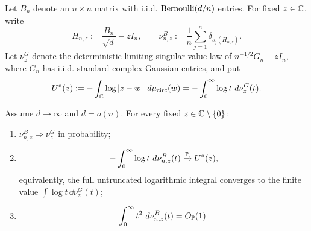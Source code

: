 Let $B_n$ denote an $n\times n$ matrix with i.i.d. $\operatorname{Bernoulli}(d/n)$ entries. For fixed $z\in\mathbb C$, write
\[
  H_{n,z}:=\frac{B_n}{\sqrt d}-zI_n,
  \qquad
  \nu^B_{n,z}:=\frac1n\sum_{j=1}^n\delta_{s_j(H_{n,z})}.
\]
Let $\nu_z^G$ denote the deterministic limiting singular-value law of
$n^{-1/2}G_n-zI_n$, where $G_n$ has i.i.d. standard complex Gaussian entries, and put
\begin{equation}\label{eq:Gaussian-log-potential}
  U^\circ(z):=-\int_\mathbb C\log\left|z-w\right|\,\,d\mu_{\mathrm{circ}}(w)
  =-\int_0^\infty\log t\,\,d\nu_z^G(t).
\end{equation}

\begin{proposition}\label{prop:Bernoulli-hermitization}
Assume $d\to\infty$ and $d=o(n)$. For every fixed $z\in\mathbb C\setminus\left\{0\right\}$:
\begin{enumerate}[label=\textup{(\roman*)}]
\item $\nu^B_{n,z}\Rightarrow\nu_z^G$ in probability;
\item
\begin{equation}\label{eq:Bernoulli-full-log}
  -\int_0^\infty\log t\,\,d\nu^B_{n,z}(t)
  \xrightarrow{\mathbb P}U^\circ(z),
\end{equation}
equivalently, the full untruncated logarithmic integral converges to the finite value
$\int\log t\,\dd\nu_z^G(t)$;
\item
\begin{equation}\label{eq:Bernoulli-second-moment}
  \int_0^\infty t^2\,\,d\nu^B_{n,z}(t)=O_{\mathbb P}(1).
\end{equation}
\end{enumerate}
\end{proposition}

